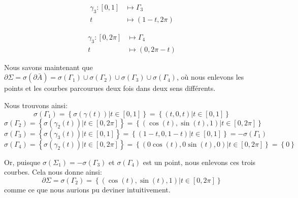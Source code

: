 \documentclass[a4paper]{article}
\begin{document}
{{        \begin{center}
        \begin{minipage}{0.45\textwidth}
        \[\begin{split}
        \gamma_3: \left[0, 1\right] &\longmapsto \Gamma_3 \\
        t &\longmapsto \left(1 - t, 2\pi\right)
        \end{split}\]
        \end{minipage}
        \hfill
        \begin{minipage}{0.45\textwidth}
        \[\begin{split}
        \gamma_3: \left[0, 2\pi\right] &\longmapsto \Gamma_4 \\
        t &\longmapsto \left(0, 2\pi - t\right)
        \end{split}\]
        \end{minipage}
        \end{center}
        
        Nous savons maintenant que $\partial \Sigma = \sigma\left(\partial \bar{A}\right) = \sigma\left(\Gamma_1\right) \cup \sigma\left(\Gamma_2\right) \cup \sigma\left(\Gamma_3\right) \cup \sigma\left(\Gamma_4\right)$, où nous enlevons les points et les courbes parcourues deux fois dans deux sens différents.

        Nous trouvons ainsi: 
        \[\sigma\left(\Gamma_1\right) = \left\{\sigma\left(\gamma\left(t\right)\right) | t \in \left[0, 1\right]\right\} = \left\{\left(t, 0, t\right) | t \in \left[0, 1\right]\right\}\] 
        \[\sigma\left(\Gamma_2\right) = \left\{\sigma\left(\gamma_2\left(t\right)\right) | t \in \left[0, 2\pi\right]\right\} = \left\{\left(\cos\left(t\right), \sin\left(t\right), 1\right) | t \in \left[0, 2\pi\right]\right\}\]
        \[\sigma\left(\Gamma_3\right) = \left\{\sigma\left(\gamma_3\left(t\right)\right) | t \in \left[0, 1\right]\right\} = \left\{\left(1 - t, 0, 1-t\right) | t \in \left[0, 1\right]\right\} = -\sigma\left(\Gamma_1\right)\]
        \[\sigma\left(\Gamma_4\right) = \left\{\sigma\left(\gamma_2\left(t\right)\right) | t \in \left[0, 2\pi\right]\right\} = \left\{\left(0\cos\left(t\right), 0\sin\left(t\right), 0\right) | t \in \left[0, 2\pi\right]\right\} = \left\{0\right\}\]
        
        Or, puisque $\sigma\left(\Sigma_1\right) = -\sigma\left(\Gamma_3\right)$ et $\sigma\left(\Gamma_4\right)$ est un point, nous enlevons ces trois courbes. Cela nous donne ainsi:
        \[\partial \Sigma = \sigma\left(\Gamma_2\right) = \left\{\left(\cos\left(t\right), \sin\left(t\right), 1\right) | t \in \left[0, 2\pi\right]\right\}\]
        comme ce que nous aurions pu deviner intuitivement.
    }

}
\end{document}
